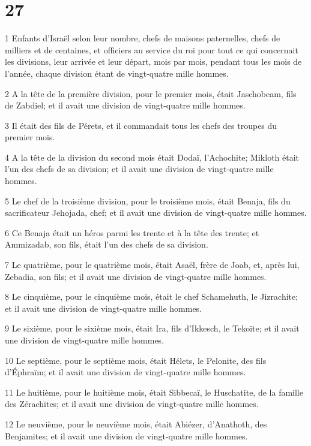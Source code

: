 \chapter{27}

\par 1 Enfants d'Israël selon leur nombre, chefs de maisons paternelles, chefs de milliers et de centaines, et officiers au service du roi pour tout ce qui concernait les divisions, leur arrivée et leur départ, mois par mois, pendant tous les mois de l'année, chaque division étant de vingt-quatre mille hommes.
\par 2 A la tête de la première division, pour le premier mois, était Jaschobeam, fils de Zabdiel; et il avait une division de vingt-quatre mille hommes.
\par 3 Il était des fils de Pérets, et il commandait tous les chefs des troupes du premier mois.
\par 4 A la tête de la division du second mois était Dodaï, l'Achochite; Mikloth était l'un des chefs de sa division; et il avait une division de vingt-quatre mille hommes.
\par 5 Le chef de la troisième division, pour le troisième mois, était Benaja, fils du sacrificateur Jehojada, chef; et il avait une division de vingt-quatre mille hommes.
\par 6 Ce Benaja était un héros parmi les trente et à la tête des trente; et Ammizadab, son fils, était l'un des chefs de sa division.
\par 7 Le quatrième, pour le quatrième mois, était Asaël, frère de Joab, et, après lui, Zebadia, son fils; et il avait une division de vingt-quatre mille hommes.
\par 8 Le cinquième, pour le cinquième mois, était le chef Schamehuth, le Jizrachite; et il avait une division de vingt-quatre mille hommes.
\par 9 Le sixième, pour le sixième mois, était Ira, fils d'Ikkesch, le Tekoïte; et il avait une division de vingt-quatre mille hommes.
\par 10 Le septième, pour le septième mois, était Hélets, le Pelonite, des fils d'Éphraïm; et il avait une division de vingt-quatre mille hommes.
\par 11 Le huitième, pour le huitième mois, était Sibbecaï, le Huschatite, de la famille des Zérachites; et il avait une division de vingt-quatre mille hommes.
\par 12 Le neuvième, pour le neuvième mois, était Abiézer, d'Anathoth, des Benjamites; et il avait une division de vingt-quatre mille hommes.
